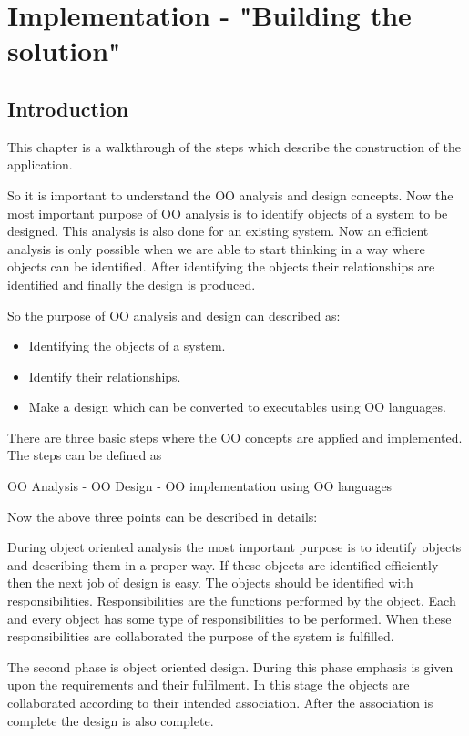 \chapter{Implementation - "Building the solution"}


\section{Introduction}

This chapter is a walkthrough of the steps which describe the construction of the application. 

So it is important to understand the OO analysis and design concepts. Now the most important purpose of OO analysis is to identify objects of a system to be designed. This analysis is also done for an existing system. Now an efficient analysis is only possible when we are able to start thinking in a way where objects can be identified. After identifying the objects their relationships are identified and finally the design is produced. 

So the purpose of OO analysis and design can described as:
\begin{itemize}
    \item Identifying the objects of a system.

    \item Identify their relationships.

    \item Make a design which can be converted to executables using OO languages.
\end{itemize}
There are three basic steps where the OO concepts are applied and implemented. The steps can be defined as

OO Analysis - OO Design - OO implementation using OO languages

Now the above three points can be described in details:

    During object oriented analysis the most important purpose is to identify objects and describing them in a proper way. If these objects are identified efficiently then the next job of design is easy. The objects should be identified with responsibilities. Responsibilities are the functions performed by the object. Each and every object has some type of responsibilities to be performed. When these responsibilities are collaborated the purpose of the system is fulfilled.

    The second phase is object oriented design. During this phase emphasis is given upon the requirements and their fulfilment. In this stage the objects are collaborated according to their intended association. After the association is complete the design is also complete.

